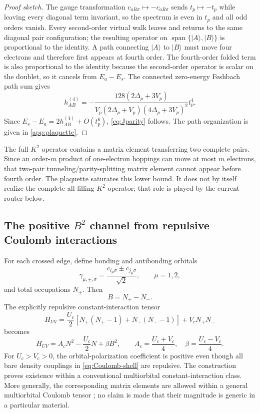 \documentclass[11pt]{article}
\theoremstyle{definition}
\theoremstyle{remark}
\newcommand{\Span}{\operatorname{span}}
\newcommand{\ket}[1]{\lvert #1\rangle}
\begin{document}
\begin{proof}[Proof sketch]
The gauge transformation $c_{aR\sigma}\mapsto-c_{aR\sigma}$ sends $t_p\mapsto-t_p$ while leaving every diagonal term invariant, so the spectrum is even in $t_p$ and all odd orders vanish.  Every second-order virtual walk leaves and returns to the same diagonal pair configuration; the resulting operator on $\Span\{\ket A,\ket B\}$ is proportional to the identity.  A path connecting $\ket A$ to $\ket B$ must move four electrons and therefore first appears at fourth order.  The fourth-order folded term is also proportional to the identity because the second-order operator is scalar on the doublet, so it cancels from $E_a-E_s$.  The connected zero-energy Feshbach path sum gives
\begin{equation}
 h_{AB}^{(4)}=-\frac{128(2\Delta_p+3V_p)}
 {V_p(2\Delta_p+V_p)(4\Delta_p+3V_p)^2}t_p^4.
\end{equation}
Since $E_s-E_a=2h_{AB}^{(4)}+O(t_p^6)$, \eqref{eq:Jparity} follows.  The path organization is given in \cref{app:plaquette}.
\end{proof}

The full $K^2$ operator contains a matrix element transferring two complete pairs.  Since an order-$m$ product of one-electron hoppings can move at most $m$ electrons, that two-pair tunneling/parity-splitting matrix element cannot appear before fourth order.  The plaquette saturates this lower bound.  It does not by itself realize the complete all-filling $K^2$ operator; that role is played by the current router below.

\subsection{The positive \texorpdfstring{$B^2$}{B-squared} channel from repulsive Coulomb interactions}

For each crossed edge, define bonding and antibonding orbitals
\begin{equation}
 \gamma_{\mu,\pm,\sigma}=\frac{c_{i_\mu\sigma}\pm c_{j_\mu\sigma}}{\sqrt2},
 \qquad \mu=1,2,
\end{equation}
and total occupations $N_\pm$.  Then
\begin{equation}
 \boxed{B=N_+-N_-.}
 \label{eq:B-polarization}
\end{equation}
The explicitly repulsive constant-interaction tensor
\begin{equation}
 H_{UV}=\frac{U_c}{2}[N_+(N_+-1)+N_-(N_--1)]+V_cN_+N_-
 \label{eq:Coulomb-shell}
\end{equation}
becomes
\begin{equation}
 \boxed{H_{UV}=A_cN^2-\frac{U_c}{2}N+\beta B^2,}
 \qquad
 A_c=\frac{U_c+V_c}{4},
 \quad
 \beta=\frac{U_c-V_c}{4}.
 \label{eq:Coulomb-decomp}
\end{equation}
For $U_c>V_c>0$, the orbital-polarization coefficient is positive even though all bare density couplings in \eqref{eq:Coulomb-shell} are repulsive.  The construction proves existence within a conventional multiorbital constant-interaction class.  More generally, the corresponding matrix elements are allowed within a general multiorbital Coulomb tensor \cite{Georges2013}; no claim is made that their magnitude is generic in a particular material.
\end{document}
